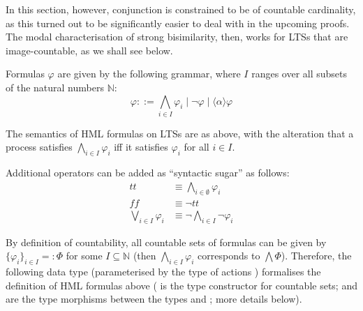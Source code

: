 \begin{isabellebody}
\begin{isamarkuptext}
In this section, however, conjunction is constrained to be of countable cardinality, as this turned out to be significantly easier to deal with in the upcoming proofs. The modal characterisation of strong bisimilarity, then, works for LTSs that are image-countable, as we shall see below.

Formulas $\varphi$ are given by the following grammar, where $I$ ranges over all subsets of the natural numbers $\mathbb{N}$:
$$\varphi ::= \textstyle\bigwedge_{i \in I} \varphi_i \mid \neg\varphi \mid \langle\alpha\rangle\varphi$$

The semantics of HML formulas on LTSs are as above, with the alteration that a process satisfies $\bigwedge_{i \in I} \varphi_i$ iff it satisfies $\varphi_i$ for all $i \in I$.

Additional operators can be added as \enquote{syntactic sugar} as follows:
\begin{align*}
    t\!t &\equiv \textstyle\bigwedge_{i \in \emptyset} \varphi_i \\
    f\!\!f &\equiv \neg t\!t \\
    \textstyle\bigvee_{i \in I} \varphi_i &\equiv \neg \textstyle\bigwedge_{i \in I} \neg\varphi_i
\end{align*}%
\end{isamarkuptext}\isamarkuptrue%
%
\isadelimdocument
%
\endisadelimdocument
%
\isatagdocument
%
\isamarkuptrue%
%
\isamarkuptrue%
%
\endisatagdocument
{\isafolddocument}%
%
\isadelimdocument
%
\endisadelimdocument
%
\begin{isamarkuptext}%
By definition of countability, all countable sets of formulas can be given by $\{\varphi_i\}_{i \in I} =: \Phi$ for some $I \subseteq \mathbb{N}$ (then $\bigwedge_{i \in I} \varphi_i$ corresponds to $\bigwedge \Phi$). Therefore, the following data type (parameterised by the type of actions ) formalises the definition of HML formulas above ( is the type constructor for countable sets;  and  are the type morphisms between the types  and ; more details below).


\end{isamarkuptext}
\end{isabellebody}
